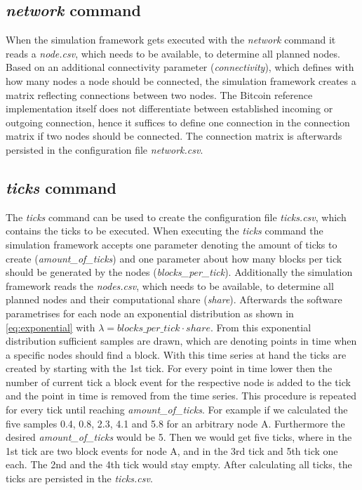 \subsection{\textit{network} command} \label{chap:network_command}

When the simulation framework gets executed with the \textit{network} command it reads a \textit{node.csv}, which needs to be available, to determine all planned nodes.
Based on an additional connectivity parameter (\textit{connectivity}), which defines with how many nodes a node should be connected, the simulation framework creates a matrix reflecting connections between two nodes.
The Bitcoin reference implementation itself does not differentiate between established incoming or outgoing connection, hence it suffices to define one connection in the connection matrix if two nodes should be connected.
The connection matrix is afterwards persisted in the configuration file \textit{network.csv}.

\subsection{\textit{ticks} command} \label{chap:ticks_command}

The \textit{ticks} command can be used to create the configuration file \textit{ticks.csv}, which contains the ticks to be executed.
When executing the \textit{ticks} command the simulation framework accepts one parameter denoting the amount of ticks to create (\textit{amount\_of\_ticks}) and one parameter about how many blocks per tick should be generated by the nodes (\textit{blocks\_per\_tick}).
Additionally the simulation framework reads the \textit{nodes.csv}, which needs to be available, to determine all planned nodes and their computational share (\textit{share}).
Afterwards the software parametrises for each node an exponential distribution as shown in \ref{eq:exponential} with $\lambda = blocks\_per\_tick \cdot share$.
From this exponential distribution sufficient samples are drawn, which are denoting points in time when a specific nodes should find a block.
With this time series at hand the ticks are created by starting with the 1st tick.
For every point in time lower then the number of current tick a block event for the respective node is added to the tick and the point in time is removed from the time series.
This procedure is repeated for every tick until reaching \textit{amount\_of\_ticks}.
For example if we calculated the five samples 0.4, 0.8, 2.3, 4.1 and 5.8 for an arbitrary node A.
Furthermore the desired \textit{amount\_of\_ticks} would be 5.
Then we would get five ticks, where in the 1st tick are two block events for node A, and in the 3rd tick  and 5th tick one each.
The 2nd and the 4th tick would stay empty. After calculating all ticks, the ticks are persisted in the \textit{ticks.csv}.

